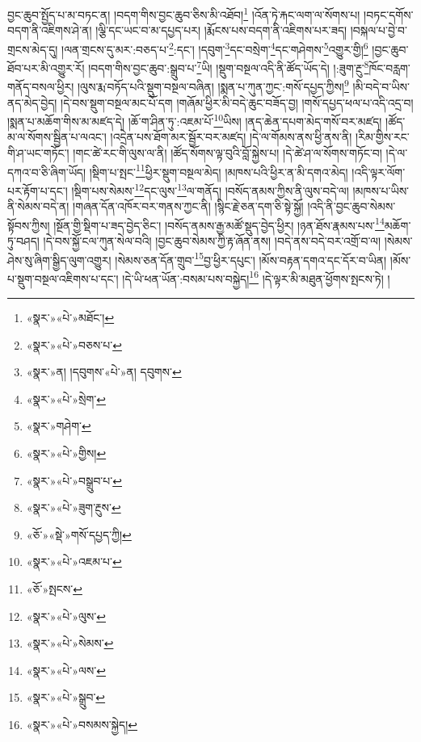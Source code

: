 བྱང་ཆུབ་སྤྱོད་པ་མ་བཏང་ན། །བདག་གིས་བྱང་ཆུབ་ཅིས་མི་འཐོབ།\footnote{«སྣར་»«པེ་»མཐོང་།} །འོན་ཏེ་རྐང་ལག་ལ་སོགས་པ། །བཏང་དགོས་བདག་ནི་འཇིགས་ཤེ་ན། །ལྕི་དང་ཡང་བ་མ་དཔྱད་པར། །རྨོངས་པས་བདག་ནི་འཇིགས་པར་ཟད། །བསྐལ་པ་བྱེ་བ་གྲངས་མེད་དུ། །ལན་གྲངས་དུ་མར་:བཅད་པ་\footnote{«སྣར་»«པེ་»བཅས་པ་}:དང་། །དབུག་\footnote{«སྣར་»ན། །དབུགས་«པེ་»ན། དབུགས་}དང་བསྲེག་\footnote{«སྣར་»«པེ་»སྲེག་}དང་གཤེགས་\footnote{«སྣར་»གཤེག་}འགྱུར་གྱི།\footnote{«སྣར་»«པེ་»གྱིས།} །བྱང་ཆུབ་ཐོབ་པར་མི་འགྱུར་རོ། །བདག་གིས་བྱང་ཆུབ་:སྒྲུབ་པ་\footnote{«སྣར་»«པེ་»བསྒྲུབ་པ་}ཡི། །སྡུག་བསྔལ་འདི་ནི་ཚོད་ཡོད་དེ། །:ཟུག་རྔུ་\footnote{«སྣར་»«པེ་»ཟུག་རྔུས་}ཁོང་བརླག་གནོད་བསལ་ཕྱིར། །ལུས་རྨ་བཏོད་པའི་སྡུག་བསྔལ་བཞིན། །སྨན་པ་ཀུན་ཀྱང་:གསོ་དཔྱད་ཀྱིས།\footnote{«ཅོ་»«སྡེ་»གསོ་དཔྱད་ཀྱི།} །མི་བདེ་བ་ཡིས་ནད་མེད་བྱེད། །དེ་བས་སྡུག་བསྔལ་མང་པོ་དག །གཞོམ་ཕྱིར་མི་བདེ་ཆུང་བཟོད་བྱ། །གསོ་དཔྱད་ཕལ་པ་འདི་འདྲ་བ། །སྨན་པ་མཆོག་གིས་མ་མཛད་དེ། །ཆོ་ག་ཤིན་ཏུ་:འཇམ་པོ་\footnote{«སྣར་»«པེ་»འཇམ་པ་}ཡིས། །ནད་ཆེན་དཔག་མེད་གསོ་བར་མཛད། །ཚོད་མ་ལ་སོགས་སྦྱིན་པ་ལའང་། །འདྲེན་པས་ཐོག་མར་སྦྱོར་བར་མཛད། །དེ་ལ་གོམས་ནས་ཕྱི་ནས་ནི། །རིམ་གྱིས་རང་གི་ཤ་ཡང་གཏོང་། །གང་ཚེ་རང་གི་ལུས་ལ་ནི། །ཚོད་སོགས་ལྟ་བུའི་བློ་སྐྱེས་པ། །དེ་ཚེ་ཤ་ལ་སོགས་གཏོང་བ། །དེ་ལ་དཀའ་བ་ཅི་ཞིག་ཡོད། །སྡིག་པ་སྤང་\footnote{«ཅོ་»སྤངས་}ཕྱིར་སྡུག་བསྔལ་མེད། །མཁས་པའི་ཕྱིར་ན་མི་དགའ་མེད། །འདི་ལྟར་ལོག་པར་རྟོག་པ་དང་། །སྡིག་པས་སེམས་\footnote{«སྣར་»«པེ་»ལུས་}དང་ལུས་\footnote{«སྣར་»«པེ་»སེམས་}ལ་གནོད། །བསོད་ནམས་ཀྱིས་ནི་ལུས་བདེ་ལ། །མཁས་པ་ཡིས་ནི་སེམས་བདེ་ན། །གཞན་དོན་འཁོར་བར་གནས་ཀྱང་ནི། །སྙིང་རྗེ་ཅན་དག་ཅི་སྟེ་སྐྱོ། །འདི་ནི་བྱང་ཆུབ་སེམས་སྟོབས་ཀྱིས། །སྔོན་གྱི་སྡིག་པ་ཟད་བྱེད་ཅིང་། །བསོད་ནམས་རྒྱ་མཚོ་སྡུད་བྱེད་ཕྱིར། །ཉན་ཐོས་རྣམས་པས་\footnote{«སྣར་»«པེ་»ལས་}མཆོག་ཏུ་བཤད། །དེ་བས་སྐྱོ་ངལ་ཀུན་སེལ་བའི། །བྱང་ཆུབ་སེམས་ཀྱི་རྟ་ཞོན་ནས། །བདེ་ནས་བདེ་བར་འགྲོ་བ་ལ། །སེམས་ཤེས་སུ་ཞིག་སྒྱིད་ལུག་འགྱུར། །སེམས་ཅན་དོན་གྲུབ་\footnote{«སྣར་»«པེ་»སྒྲུབ་}བྱ་ཕྱིར་དཔུང་། །མོས་བརྟན་དགའ་དང་དོར་བ་ཡིན། །མོས་པ་སྡུག་བསྔལ་འཇིགས་པ་དང་། །དེ་ཡི་ཕན་ཡོན་:བསམ་པས་བསྐྱེད།\footnote{«སྣར་»«པེ་»བསམས་སྐྱེད།} །དེ་ལྟར་མི་མཐུན་ཕྱོགས་སྤངས་ཏེ། །
